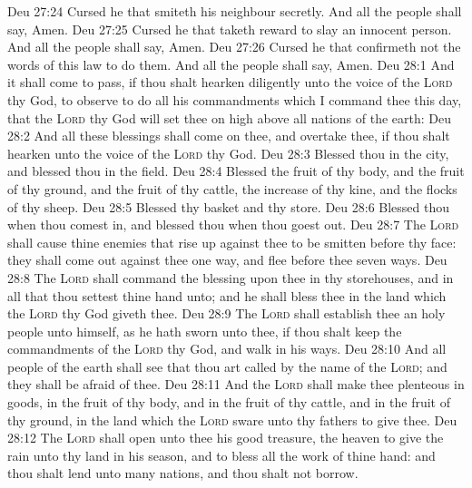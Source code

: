 \vs Deu 27:24 Cursed  he that smiteth his neighbour secretly. And all the people shall say, Amen.
\vs Deu 27:25 Cursed  he that taketh reward to slay an innocent person. And all the people shall say, Amen.
\vs Deu 27:26 Cursed  he that confirmeth not  the words of this law to do them. And all the people shall say, Amen.
\vs Deu 28:1 And it shall come to pass, if thou shalt hearken diligently unto the voice of the \textsc{Lord} thy God, to observe  to do all his commandments which I command thee this day, that the \textsc{Lord} thy God will set thee on high above all nations of the earth:
\vs Deu 28:2 And all these blessings shall come on thee, and overtake thee, if thou shalt hearken unto the voice of the \textsc{Lord} thy God.
\vs Deu 28:3 Blessed  thou  in the city, and blessed  thou  in the field.
\vs Deu 28:4 Blessed  the fruit of thy body, and the fruit of thy ground, and the fruit of thy cattle, the increase of thy kine, and the flocks of thy sheep.
\vs Deu 28:5 Blessed  thy basket and thy store.
\vs Deu 28:6 Blessed  thou  when thou comest in, and blessed  thou  when thou goest out.
\vs Deu 28:7 The \textsc{Lord} shall cause thine enemies that rise up against thee to be smitten before thy face: they shall come out against thee one way, and flee before thee seven ways.
\vs Deu 28:8 The \textsc{Lord} shall command the blessing upon thee in thy storehouses, and in all that thou settest thine hand unto; and he shall bless thee in the land which the \textsc{Lord} thy God giveth thee.
\vs Deu 28:9 The \textsc{Lord} shall establish thee an holy people unto himself, as he hath sworn unto thee, if thou shalt keep the commandments of the \textsc{Lord} thy God, and walk in his ways.
\vs Deu 28:10 And all people of the earth shall see that thou art called by the name of the \textsc{Lord}; and they shall be afraid of thee.
\vs Deu 28:11 And the \textsc{Lord} shall make thee plenteous in goods, in the fruit of thy body, and in the fruit of thy cattle, and in the fruit of thy ground, in the land which the \textsc{Lord} sware unto thy fathers to give thee.
\vs Deu 28:12 The \textsc{Lord} shall open unto thee his good treasure, the heaven to give the rain unto thy land in his season, and to bless all the work of thine hand: and thou shalt lend unto many nations, and thou shalt not borrow.
